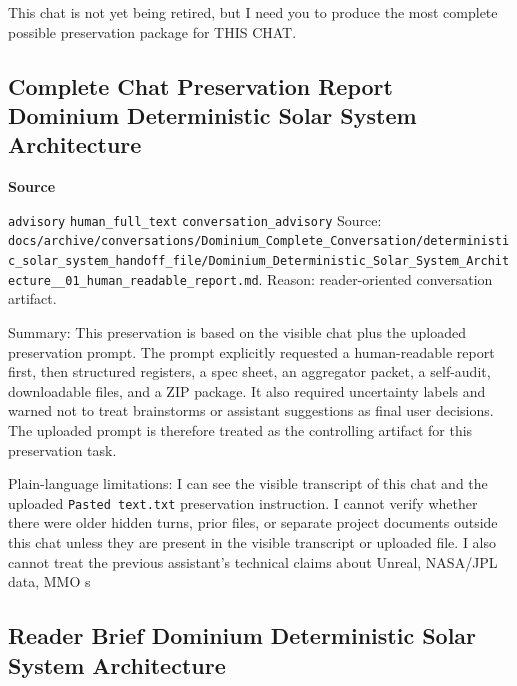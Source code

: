 \documentclass[9pt,a4paper,openany]{book}
\newcommand{\vonecallout}[3]{\par\medskip\noindent\begingroup\setlength{\fboxsep}{7pt}\colorbox{DomCalloutBg}{\parbox{0.94\linewidth}{\textbf{\textcolor{#1}{#2}}\par #3}}\endgroup\par\medskip}
\begin{document}
This chat is not yet being retired, but I need you to produce the most complete possible preservation package for THIS CHAT.\allowbreak{}



\subsection{Complete Chat Preservation Report Dominium Deterministic Solar System Architecture}

\vonecallout{DomSlate}{Source}{\texttt{advisory} \texttt{human\_\allowbreak{}full\_\allowbreak{}text} \texttt{conversation\_\allowbreak{}advisory} Source: \texttt{docs/\allowbreak{}archive/\allowbreak{}conversations/\allowbreak{}Dominium\_\allowbreak{}Complete\_\allowbreak{}Conversation/\allowbreak{}deterministic\_\allowbreak{}solar\_\allowbreak{}system\_\allowbreak{}handoff\_\allowbreak{}file/\allowbreak{}Dominium\_\allowbreak{}Deterministic\_\allowbreak{}Solar\_\allowbreak{}System\_\allowbreak{}Architecture\_\allowbreak{}\_\allowbreak{}01\_\allowbreak{}human\_\allowbreak{}readable\_\allowbreak{}report.\allowbreak{}md}.\allowbreak{} Reason: reader-\allowbreak{}oriented conversation artifact.\allowbreak{}}

Summary: This preservation is based on the visible chat plus the uploaded preservation prompt.\allowbreak{} The prompt explicitly requested a human-\allowbreak{}readable report first, then structured registers, a spec sheet, an aggregator packet, a self-\allowbreak{}audit, downloadable files, and a ZIP package.\allowbreak{} It also required uncertainty labels and warned not to treat brainstorms or assistant suggestions as final user decisions.\allowbreak{} The uploaded prompt is therefore treated as the controlling artifact for this preservation task.\allowbreak{}


Plain-\allowbreak{}language limitations: I can see the visible transcript of this chat and the uploaded \texttt{Pasted text.\allowbreak{}txt} preservation instruction.\allowbreak{} I cannot verify whether there were older hidden turns, prior files, or separate project documents outside this chat unless they are present in the visible transcript or uploaded file.\allowbreak{} I also cannot treat the previous assistant's technical claims about Unreal, NASA/\allowbreak{}JPL data, MMO s



\subsection{Reader Brief Dominium Deterministic Solar System Architecture}
\end{document}
